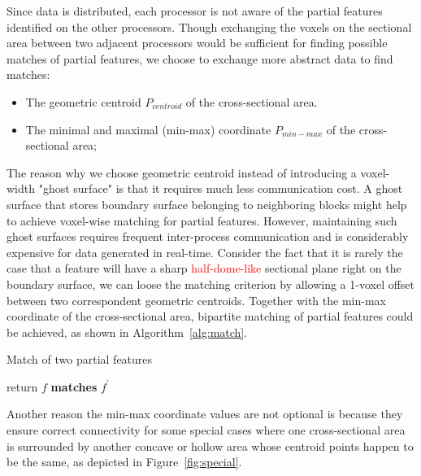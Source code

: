 \documentclass[10pt, conference, compsocconf]{IEEEtran}
\begin{document}
Since data is distributed, each processor is not aware of the partial features identified on the other processors. Though exchanging the voxels on the sectional area between two adjacent processors would be sufficient for finding possible matches of partial features, we choose to exchange more abstract data to find matches:

\begin{itemize}
	\item The geometric centroid $P_{centroid}$ of the cross-sectional area.
	\item The minimal and maximal (min-max) coordinate $P_{min-max}$ of the cross-sectional area;
\end{itemize}

The reason why we choose geometric centroid instead of introducing a voxel-width "ghost surface" is that it requires much less communication cost. A ghost surface that stores boundary surface belonging to neighboring blocks might help to achieve voxel-wise matching for partial features. However, maintaining such ghost surfaces requires frequent inter-process communication and is considerably expensive for data generated in real-time. Consider the fact that it is rarely the case that a feature will have a sharp \textcolor{red}{half-dome-like} sectional plane right on the boundary surface, we can loose the matching criterion by allowing a 1-voxel offset between two correspondent geometric centroids. Together with the min-max coordinate of the cross-sectional area, bipartite matching of partial features could be achieved, as shown in Algorithm~\ref{alg:match}.

\begin{algorithm}
\caption{Match of two partial features}
	\begin{algorithmic}[1]
			\STATE return $f$ \textbf{matches} $f^{'}$
		\ENDIF
	\end{algorithmic}
\label{alg:match}
\end{algorithm}

Another reason the min-max coordinate values are not optional is because they ensure correct connectivity for some special cases where one cross-sectional area is surrounded by another concave or hollow area whose centroid points happen to be the same, as depicted in Figure~\ref{fig:special}.
\end{document}
